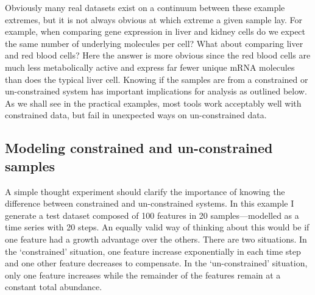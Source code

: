 \documentclass[
  onecolumn]{article}
\begin{document}
Obviously many real datasets exist on a continuum between these example extremes, but it is not always obvious at which extreme a given sample lay. For example, when comparing gene expression in liver and kidney cells do we expect the same number of underlying molecules per cell? What about comparing liver and red blood cells? Here the answer is more obvious since the red blood cells are much less metabolically active and express far fewer unique mRNA molecules than does the typical liver cell. Knowing if the samples are from a constrained or un-constrained system has important implications for analysis as outlined below. As we shall see in the practical examples, most tools work acceptably well with constrained data, but fail in unexpected ways on un-constrained data.

\hypertarget{modeling-constrained-and-un-constrained-samples}{%
\subsection{Modeling constrained and un-constrained samples}\label{modeling-constrained-and-un-constrained-samples}}

A simple thought experiment should clarify the importance of knowing the difference between constrained and un-constrained systems. In this example I generate a test dataset composed of 100 features in 20 samples---modelled as a time series with 20 steps. An equally valid way of thinking about this would be if one feature had a growth advantage over the others. There are two situations. In the `constrained' situation, one feature increase exponentially in each time step and one other feature decreases to compensate. In the `un-constrained' situation, only one feature increases while the remainder of the features remain at a constant total abundance.
\end{document}

